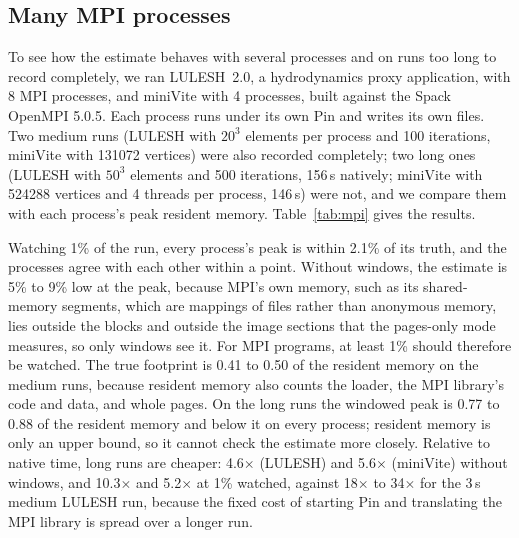 \documentclass[11pt]{article}
\newcommand{\tabref}[1]{Table~\ref{#1}}
\begin{document}
\subsection{Many MPI processes}
\label{sec:mpi}

To see how the estimate behaves with several processes and on runs too long to record completely, we ran LULESH~2.0, a hydrodynamics proxy application, with 8 MPI processes, and miniVite with 4 processes, built against the Spack OpenMPI 5.0.5. Each process runs under its own Pin and writes its own files. Two medium runs (LULESH with $20^3$ elements per process and 100 iterations, miniVite with 131072 vertices) were also recorded completely; two long ones (LULESH with $50^3$ elements and 500 iterations, 156\,s natively; miniVite with 524288 vertices and 4 threads per process, 146\,s) were not, and we compare them with each process's peak resident memory. \tabref{tab:mpi} gives the results.

Watching 1\% of the run, every process's peak is within 2.1\% of its truth, and the processes agree with each other within a point. Without windows, the estimate is 5\% to 9\% low at the peak, because MPI's own memory, such as its shared-memory segments, which are mappings of files rather than anonymous memory, lies outside the blocks and outside the image sections that the pages-only mode measures, so only windows see it. For MPI programs, at least 1\% should therefore be watched. The true footprint is 0.41 to 0.50 of the resident memory on the medium runs, because resident memory also counts the loader, the MPI library's code and data, and whole pages. On the long runs the windowed peak is 0.77 to 0.88 of the resident memory and below it on every process; resident memory is only an upper bound, so it cannot check the estimate more closely. Relative to native time, long runs are cheaper: 4.6$\times$ (LULESH) and 5.6$\times$ (miniVite) without windows, and 10.3$\times$ and 5.2$\times$ at 1\% watched, against 18$\times$ to 34$\times$ for the 3\,s medium LULESH run, because the fixed cost of starting Pin and translating the MPI library is spread over a longer run.
\end{document}
